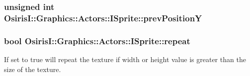 \hypertarget{class_osiris_i_1_1_graphics_1_1_actors_1_1_i_sprite_afdfbeedb57afeb3cb21ec1b6d265894b}{
\subsubsection[{prev\-Position\-Y}]{\setlength{\rightskip}{0pt plus 5cm}unsigned int Osiris\-I\-::\-Graphics\-::\-Actors\-::\-I\-Sprite\-::prev\-Position\-Y\hspace{0.3cm}{\ttfamily [protected]}}}\label{class_osiris_i_1_1_graphics_1_1_actors_1_1_i_sprite_afdfbeedb57afeb3cb21ec1b6d265894b}
\hypertarget{class_osiris_i_1_1_graphics_1_1_actors_1_1_i_sprite_a0e1951b7cd86b1dc0dc96cb8342f296b}{
\subsubsection[{repeat}]{\setlength{\rightskip}{0pt plus 5cm}bool Osiris\-I\-::\-Graphics\-::\-Actors\-::\-I\-Sprite\-::repeat\hspace{0.3cm}{\ttfamily [protected]}}}\label{class_osiris_i_1_1_graphics_1_1_actors_1_1_i_sprite_a0e1951b7cd86b1dc0dc96cb8342f296b}


If set to true will repeat the texture if width or height value is greater than the size of the texture. 

